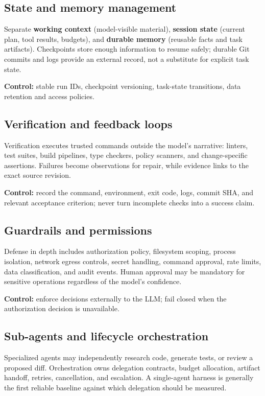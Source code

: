 \documentclass[10pt,letterpaper]{article}
\newcommand{\term}[1]{\textbf{\color{DeepBlue}#1}}
\begin{document}
\subsection{State and memory management}
Separate \term{working context} (model-visible material), \term{session state} (current plan, tool results, budgets), and \term{durable memory} (reusable facts and task artifacts). Checkpoints store enough information to resume safely; durable Git commits and logs provide an external record, not a substitute for explicit task state.

\textbf{Control:} stable run IDs, checkpoint versioning, task-state transitions, data retention and access policies.

\subsection{Verification and feedback loops}
Verification executes trusted commands outside the model's narrative: linters, test suites, build pipelines, type checkers, policy scanners, and change-specific assertions. Failures become observations for repair, while evidence links to the exact source revision.

\textbf{Control:} record the command, environment, exit code, logs, commit SHA, and relevant acceptance criterion; never turn incomplete checks into a success claim.

\subsection{Guardrails and permissions}
Defense in depth includes authorization policy, filesystem scoping, process isolation, network egress controls, secret handling, command approval, rate limits, data classification, and audit events. Human approval may be mandatory for sensitive operations regardless of the model's confidence.

\textbf{Control:} enforce decisions externally to the LLM; fail closed when the authorization decision is unavailable.

\subsection{Sub-agents and lifecycle orchestration}
Specialized agents may independently research code, generate tests, or review a proposed diff. Orchestration owns delegation contracts, budget allocation, artifact handoff, retries, cancellation, and escalation. A single-agent harness is generally the first reliable baseline against which delegation should be measured.
\end{document}
